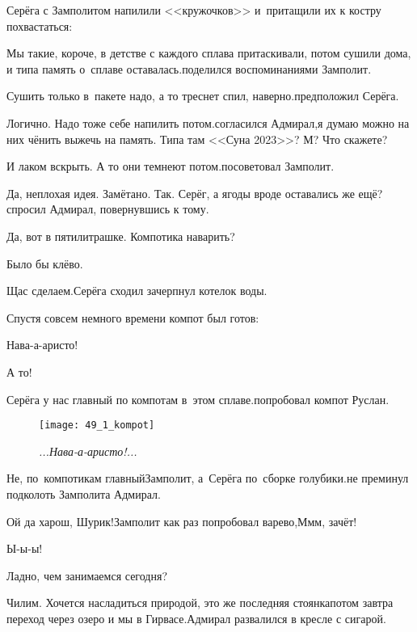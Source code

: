 Серёга с Замполитом напилили <<кружочков>> и~притащили их к костру похвастаться:

\diagdash Мы такие, короче, в детстве с каждого сплава притаскивали, потом сушили дома, и типа память о~сплаве оставалась.\mdash поделился воспоминаниями Замполит.

\diagdash Сушить только в~пакете надо, а то треснет спил, наверно.\mdash предположил Серёга.

\diagdash Логично. Надо тоже себе напилить потом.\mdash согласился Адмирал,\mdash я думаю можно на них чё\sdash нить выжечь на память. Типа там <<Суна 2023>>? М? Что скажете?

\diagdash И лаком вскрыть. А то они темнеют потом.\mdash посоветовал Замполит.

\diagdash Да, неплохая идея. Замётано. Так. Серёг, а ягоды вроде оставались же ещё?\mdash спросил Адмирал, повернувшись к тому.

\diagdash Да, вот в пятилитрашке. Компотика наварить?

\diagdash Было бы клёво.

\diagdash Щас сделаем.\mdash Серёга сходил зачерпнул котелок воды.

Спустя совсем немного времени компот был готов:

\diagdash Нава-а-аристо!

\diagdash А то!

\diagdash Серёга у нас главный по компотам в~этом сплаве.\mdash попробовал компот Руслан.

\begin{wrapfigure}[10]{r}{0.51\textwidth}
	\centering
	\texttt{[image: 49\_1\_kompot]}
	\caption{\small\textit{...Нава-а-аристо!...}}
\end{wrapfigure}

\diagdash Не, по~компотикам главный\mdash Замполит, а~Серёга по~сборке голубики.\mdash не преминул подколоть Замполита Адмирал.

\diagdash Ой да харош, Шурик!\mdash Замполит как раз попробовал варево,\mdash М\sdash м\sdash м, зачёт!

\diagdash Ы-ы-ы!

\newpage
\diagdash Ладно, чем занимаемся сегодня?

\diagdash Чилим. Хочется насладиться природой, это же последняя стоянка\mdash потом завтра переход через озеро и мы в Гирвасе.\mdash Адмирал развалился в кресле с сигарой.


